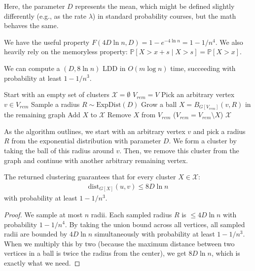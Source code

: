 Here, the parameter $D$ represents the mean, which might be defined slightly differently (e.g., as the rate $\lambda$) in standard probability courses, but the math behaves the same.

We have the useful property $F(4D \ln n, D) = 1 - e^{-4 \ln n} = 1 - 1/n^4$. 
We also heavily rely on the memoryless property: $\mathbb{P}[X > x+s \mid X > s] = \mathbb{P}[X > x]$.

\begin{izrek}
    We can compute a $(D, 8 \ln n)$ LDD in $O(m \log n)$ time, succeeding with probability at least $1 - 1/n^3$.

    \begin{algorithm}
    \caption{ComputeLDD($G, D$)}\label{alg:computeLDD}
    \begin{algorithmic}
    \State Start with an empty set of clusters $\mathcal{X} = \emptyset$
    \State $V_{rem} = V$
        \State Pick an arbitrary vertex $v \in V_{rem}$
        \State Sample a radius $R \sim \text{ExpDist}(D)$
        \State Grow a ball $X = B_{G[V_{rem}]}(v, R)$ in the remaining graph
        \State Add $X$ to $\mathcal{X}$
        \State Remove $X$ from $V_{rem}$ ($V_{rem} = V_{rem} \setminus X$)
    \EndWhile
    \State \Return $\mathcal{X}$
    \end{algorithmic}
    \end{algorithm}
\end{izrek}

As the algorithm outlines, we start with an arbitrary vertex $v$ and pick a radius $R$ from the exponential distribution with parameter $D$. We form a cluster by taking the ball of this radius around $v$. Then, we remove this cluster from the graph and continue with another arbitrary remaining vertex.

\begin{lema}
    The returned clustering guarantees that for every cluster $X \in \mathcal{X}$:
    \begin{align}
        \text{dist}_{G[X]}(u,v) \leq 8D \ln n
    \end{align}
    with probability at least $1 - 1/n^3$.
\end{lema}
\begin{proof}
    We sample at most $n$ radii. Each sampled radius $R$ is $\leq 4D \ln n$ with probability $1 - 1/n^4$. By taking the union bound across all vertices, all sampled radii are bounded by $4D \ln n$ simultaneously with probability at least $1 - 1/n^3$. When we multiply this by two (because the maximum distance between two vertices in a ball is twice the radius from the center), we get $8D \ln n$, which is exactly what we need.
\end{proof}

